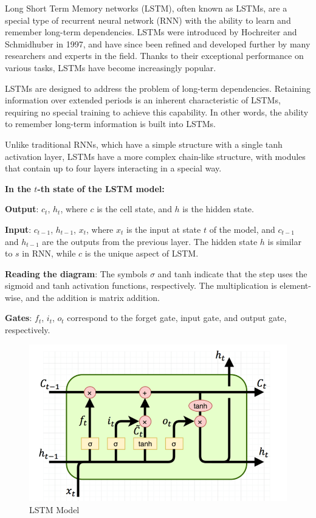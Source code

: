 \documentclass{ieeeojies}
\begin{document}
   Long Short Term Memory networks (LSTM), often known as LSTMs, are a special type of recurrent neural network (RNN) with the ability to learn and remember long-term dependencies. LSTMs were introduced by Hochreiter and Schmidhuber in 1997, and have since been refined and developed further by many researchers and experts in the field. Thanks to their exceptional performance on various tasks, LSTMs have become increasingly popular.

  LSTMs are designed to address the problem of long-term dependencies. Retaining information over extended periods is an inherent characteristic of LSTMs, requiring no special training to achieve this capability. In other words, the ability to remember long-term information is built into LSTMs.

  Unlike traditional RNNs, which have a simple structure with a single tanh activation layer, LSTMs have a more complex chain-like structure, with modules that contain up to four layers interacting in a special way.

  \noindent 
  \textbf{In the \(t\)-th state of the LSTM model:}

\textbf{Output}: \(c_t\), \(h_t\), where \(c\) is the cell state, and \(h\) is the hidden state.

\textbf{Input}: \(c_{t-1}\), \(h_{t-1}\), \(x_t\), where \(x_t\) is the input at state \(t\) of the model, and \(c_{t-1}\) and \(h_{t-1}\) are the outputs from the previous layer. The hidden state \(h\) is similar to \(s\) in RNN, while \(c\) is the unique aspect of LSTM.

\textbf{Reading the diagram}: The symbols \(\sigma\) and tanh indicate that the step uses the sigmoid and tanh activation functions, respectively. The multiplication is element-wise, and the addition is matrix addition.

\textbf{Gates}: \(f_t\), \(i_t\), \(o_t\) correspond to the forget gate, input gate, and output gate, respectively.

\begin{figure}[H]
  \centering
  \begin{minipage}{0.5\textwidth}
    \centering
    \includegraphics[width=\textwidth]{bibliography/Figure/LSTM Model.png}
    \caption{LSTM Model}
    \label{fig:1}
  \end{minipage}
\end{figure}
\end{document}

